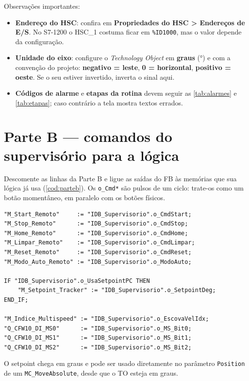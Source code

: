 \documentclass[12pt, oneside, a4paper, chapter=TITLE, section=TITLE, english, brazil]{abntex2}
\begin{document}
Observações importantes:

\begin{itemize}
  \item \textbf{Endereço do HSC}: confira em \textbf{Propriedades do HSC > Endereços de E/S}. No S7-1200 o HSC\_1 costuma ficar em \texttt{\%ID1000}, mas o valor depende da configuração.
  \item \textbf{Unidade do eixo}: configure o \emph{Technology Object} em \textbf{graus} (°) e com a convenção do projeto: \textbf{negativo = leste}, \textbf{0 = horizontal}, \textbf{positivo = oeste}. Se o seu estiver invertido, inverta o sinal aqui.
  \item \textbf{Códigos de alarme} e \textbf{etapas da rotina} devem seguir as \autoref{tab:alarmes} e \autoref{tab:etapas}; caso contrário a tela mostra textos errados.
\end{itemize}

\section{Parte B --- comandos do supervisório para a lógica}

Descomente as linhas da Parte B e ligue as saídas do FB às memórias que sua lógica já usa (\autoref{cod:parteb}). Os \texttt{o\_Cmd*} são pulsos de um ciclo: trate-os como um botão momentâneo, em paralelo com os botões físicos.

\begin{lstlisting}[caption={Parte B do FC\_Supervisorio\_IO}, label={cod:parteb}]
"M_Start_Remoto"     := "IDB_Supervisorio".o_CmdStart;
"M_Stop_Remoto"      := "IDB_Supervisorio".o_CmdStop;
"M_Home_Remoto"      := "IDB_Supervisorio".o_CmdHome;
"M_Limpar_Remoto"    := "IDB_Supervisorio".o_CmdLimpar;
"M_Reset_Remoto"     := "IDB_Supervisorio".o_CmdReset;
"M_Modo_Auto_Remoto" := "IDB_Supervisorio".o_ModoAuto;

IF "IDB_Supervisorio".o_UsaSetpointPC THEN
    "M_Setpoint_Tracker" := "IDB_Supervisorio".o_SetpointDeg;
END_IF;

"M_Indice_Multispeed" := "IDB_Supervisorio".o_EscovaVelIdx;
"Q_CFW10_DI_MS0"      := "IDB_Supervisorio".o_MS_Bit0;
"Q_CFW10_DI_MS1"      := "IDB_Supervisorio".o_MS_Bit1;
"Q_CFW10_DI_MS2"      := "IDB_Supervisorio".o_MS_Bit2;
\end{lstlisting}

O setpoint chega em graus e pode ser usado diretamente no parâmetro \texttt{Position} de um \texttt{MC\_MoveAbsolute}, desde que o TO esteja em graus.
\end{document}
